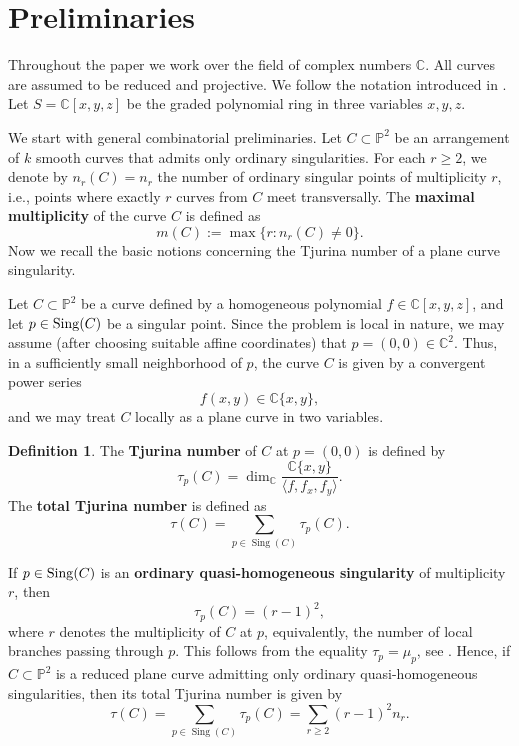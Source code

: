 \documentclass[11pt]{article}
\theoremstyle{plain}
\theoremstyle{definition}
\newtheorem{definition}[theorem]{Definition}
\theoremstyle{remark}
\begin{document}
\section{Preliminaries}

Throughout the paper we work over the field of complex numbers $\mathbb{C}$. All curves are assumed to be reduced and projective. We follow the notation introduced in \cite{Dimca}.
Let $S = \mathbb{C}[x,y,z]$ be the graded polynomial ring in three variables $x,y,z$.

We start with general combinatorial preliminaries. Let $C \subset \mathbb{P}^2$ be an arrangement of $k$ smooth curves that admits only ordinary singularities. For each $r \geq 2$, we denote by $n_r(C)=n_{r}$ the number of ordinary singular points of multiplicity $r$, i.e., points where exactly $r$ curves from $C$ meet transversally. The \textbf{maximal multiplicity} of the curve $C$ is defined as
\[
m(C) := \max \{ r : n_r(C) \neq 0 \}.
\]
Now we recall the basic notions concerning the Tjurina number of a plane curve singularity.

Let $C \subset \mathbb{P}^2$ be a curve defined by a homogeneous polynomial 
$f \in \mathbb{C}[x,y,z]$, and let $p \in {\rm Sing}(C)$ be a singular point. Since the problem is local in nature, we may assume (after choosing suitable affine coordinates) that 
$p = (0,0) \in \mathbb{C}^2$. Thus, in a sufficiently small neighborhood of $p$, the curve $C$ is given by a convergent power series
\[
f(x,y) \in \mathbb{C}\{x,y\},
\]
and we may treat $C$ locally as a plane curve in two variables. 

\begin{definition}
The \textbf{Tjurina number} of $C$ at $p = (0,0)$ is defined by
\[
\tau_{p}(C) = \dim_{\mathbb{C}} \frac{\mathbb{C}\{x,y\}}{\langle f, f_x, f_y\rangle}.
\]
The \textbf{total Tjurina number} is defined as
\[
\tau(C) = \sum_{p \in \operatorname{Sing}(C)} \tau_{p}(C).
\]
\end{definition}
\noindent
If $p \in {\rm Sing}(C)$ is an \textbf{ordinary quasi-homogeneous singularity} of multiplicity $r$, then
\[
\tau_{p}(C) = (r-1)^2,
\]
where $r$ denotes the multiplicity of $C$ at $p$, equivalently, the number of local branches passing through $p$. This follows from the equality $\tau_p = \mu_p$, see \cite{KS}. Hence, if $C \subset \mathbb{P}^{2}$ is a reduced plane curve admitting only ordinary quasi-homogeneous singularities, then its total Tjurina number is given by
\[
\tau(C) = \sum_{p \in \operatorname{Sing}(C)} \tau_{p}(C)
= \sum_{r \ge 2} (r-1)^2 n_r.
\]
\end{document}
